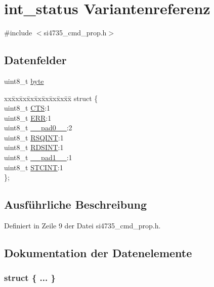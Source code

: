 \hypertarget{unionint__status}{}\section{int\+\_\+status Variantenreferenz}
\label{unionint__status}


{\ttfamily \#include $<$si4735\+\_\+cmd\+\_\+prop.\+h$>$}

\subsection*{Datenfelder}
\begin{DoxyCompactItemize}
\item 
uint8\+\_\+t \hyperlink{unionint__status_a96f44d20f1dbf1c8785a7bc99a46164c}{byte}
\item 
\begin{tabbing}
xx\=xx\=xx\=xx\=xx\=xx\=xx\=xx\=xx\=\kill
struct \{\\
\>uint8\_t \hyperlink{unionint__status_a7f1760325354f291b9a0190e7e355ca8}{CTS}:1\\
\>uint8\_t \hyperlink{unionint__status_afb74dff3cfacd68c02883e5282ef2f59}{ERR}:1\\
\>uint8\_t \hyperlink{unionint__status_a8b4eebe79ded0459acec2f4950102ba3}{\_\_pad0\_\_}:2\\
\>uint8\_t \hyperlink{unionint__status_a9637ec0bb6d40570ea68a1b96c5d561e}{RSQINT}:1\\
\>uint8\_t \hyperlink{unionint__status_a4fac7351844086822dbf634529f6cfbd}{RDSINT}:1\\
\>uint8\_t \hyperlink{unionint__status_a77f12d2e278bd5c07712648ac0df5e08}{\_\_pad1\_\_}:1\\
\>uint8\_t \hyperlink{unionint__status_a1026d3a63b328db2451abc49e0bd5a2c}{STCINT}:1\\
\}; \\

\end{tabbing}\end{DoxyCompactItemize}


\subsection{Ausführliche Beschreibung}


Definiert in Zeile 9 der Datei si4735\+\_\+cmd\+\_\+prop.\+h.



\subsection{Dokumentation der Datenelemente}
\hypertarget{unionint__status_ab0df261a25554472c9465d126c015b91}{}\subsubsection[{"@1}]{\setlength{\rightskip}{0pt plus 5cm}struct \{ ... \} }\label{unionint__status_ab0df261a25554472c9465d126c015b91}
\hypertarget{unionint__status_a8b4eebe79ded0459acec2f4950102ba3}{}
